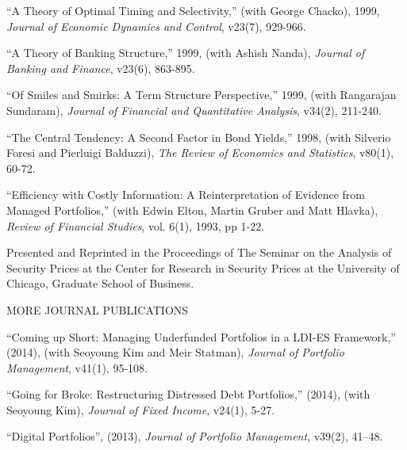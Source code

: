 \documentclass{article}
\begin{document}
\begin{etaremune}
\item
``A Theory of Optimal Timing and Selectivity,'' 
(with George Chacko), 1999, {\it Journal of
Economic Dynamics and Control}, v23(7), 929-966.

\item
``A Theory of Banking Structure,'' 1999, (with Ashish Nanda),
{\it Journal of Banking and Finance}, v23(6), 863-895. 

\item
``Of Smiles and Smirks: A Term Structure Perspective,'' 1999, (with
Rangarajan Sundaram), {\it Journal of Financial and Quantitative
Analysis}, v34(2), 211-240.


\item ``The Central Tendency: A Second Factor in Bond Yields,'' 1998,
(with Silverio Foresi and Pierluigi Balduzzi), {\it The Review of
Economics and Statistics}, v80(1), 60-72.

\item
``Efficiency with Costly Information: A Reinterpretation of
Evidence from Managed Portfolios,'' (with Edwin Elton, Martin Gruber and Matt 
Hlavka), {\it Review of Financial Studies}, vol. 6(1), 1993, pp 1-22. 

Presented and Reprinted in the Proceedings of The Seminar on the
Analysis of Security Prices at the Center for Research in Security
Prices at the University of Chicago, Graduate School of Business.


\begin{description}
\item[MORE JOURNAL PUBLICATIONS] \mbox{}
\end{description}


\item ``Coming up Short: Managing Underfunded Portfolios in
a LDI-ES Framework,'' (2014), (with Seoyoung Kim and Meir Statman), {\it Journal of Portfolio Management}, v41(1), 95-108. 

\item ``Going for Broke: Restructuring Distressed Debt Portfolios,'' (2014), (with Seoyoung Kim),  {\it Journal of Fixed Income}, v24(1), 5-27. 

\item ``Digital Portfolios'', (2013), {\it Journal of Portfolio Management}, v39(2), 41--48. 


\end{etaremune}
\end{document}
